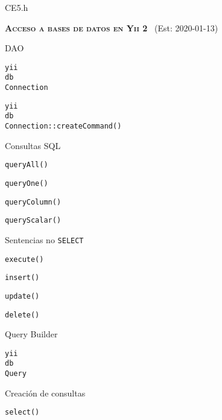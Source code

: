 \begin{longenum}
\begin{longenum}
\begin{longenum}
\begin{longenum}
\begin{longenum}
                    \item CE5.h
                \end{longenum}
            \end{longenum}
        \end{longenum}
    \end{longenum}
    \item \textbf{\textsc{Acceso a bases de datos en Yii 2}} \ (Est: 2020-01-13)
    \begin{longenum}
        \item DAO
        \begin{longenum}
            \item \texttt{yii\\db\\Connection}
            \item \texttt{yii\\db\\Connection::createCommand()}
            \item Consultas SQL
            \begin{longenum}
                \item \texttt{queryAll()}
                \item \texttt{queryOne()}
                \item \texttt{queryColumn()}
                \item \texttt{queryScalar()}
            \end{longenum}
            \item Sentencias no \texttt{SELECT}
            \begin{longenum}
                \item \texttt{execute()}
                \item \texttt{insert()}
                \item \texttt{update()}
                \item \texttt{delete()}
            \end{longenum}
        \end{longenum}
        \item Query Builder
        \begin{longenum}
            \item \texttt{yii\\db\\Query}
            \item Creación de consultas
            \begin{longenum}
                \item \texttt{select()}

\end{longenum}
\end{longenum}
\end{longenum}
\end{longenum}
